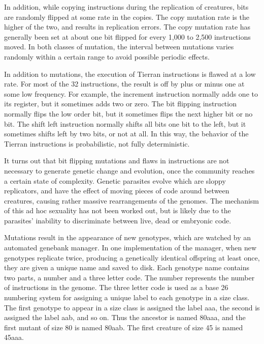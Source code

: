 In addition, while copying instructions during the replication
of creatures, bits are randomly flipped at some rate in the copies.  The copy
mutation rate is the higher of the two, and results in replication errors.
The copy mutation rate has generally been set at about one bit flipped for
every 1,000 to 2,500 instructions moved.  In both classes of mutation,
the interval between mutations varies randomly within a certain range to
avoid possible periodic effects.

In addition to mutations, the execution of Tierran instructions is flawed
at a low rate.  For most of the 32 instructions, the result is off by plus
or minus one at some low frequency.  For example, the increment instruction
normally adds one to its register, but it sometimes adds two or zero.  The
bit flipping instruction normally flips the low order bit, but it sometimes
flips the next higher bit or no bit.  The shift left instruction normally
shifts all bits one bit to the left, but it sometimes shifts left by two
bits, or not at all.  In this way, the behavior of the Tierran instructions
is probabilistic, not fully deterministic.

It turns out that bit flipping mutations and flaws in instructions are not
necessary to generate genetic change and evolution, once the community
reaches a certain state of complexity.  Genetic parasites evolve which are
sloppy replicators, and have the effect of moving pieces of code around
between creatures, causing rather massive rearrangements of the genomes.
The mechanism of this ad hoc sexuality has not been worked out, but is
likely due to the parasites' inability to discriminate between live, dead
or embryonic code.

Mutations result in the appearance of new genotypes, which are watched
by an automated genebank manager.  In one implementation of the manager,
when new genotypes replicate twice, producing a genetically identical
offspring at least once, they are given a unique name and saved to disk.
Each genotype name contains two parts, a number and a three letter code.
The number represents the number of instructions in the genome.  The three
letter code is used as a base 26 numbering system for assigning a unique
label to each genotype in a size class.  The first genotype to appear in
a size class is assigned the label aaa, the second is assigned the label
aab, and so on.  Thus the ancestor is named 80aaa, and the first mutant
of size 80 is named 80aab.  The first creature of size 45 is named 45aaa.

